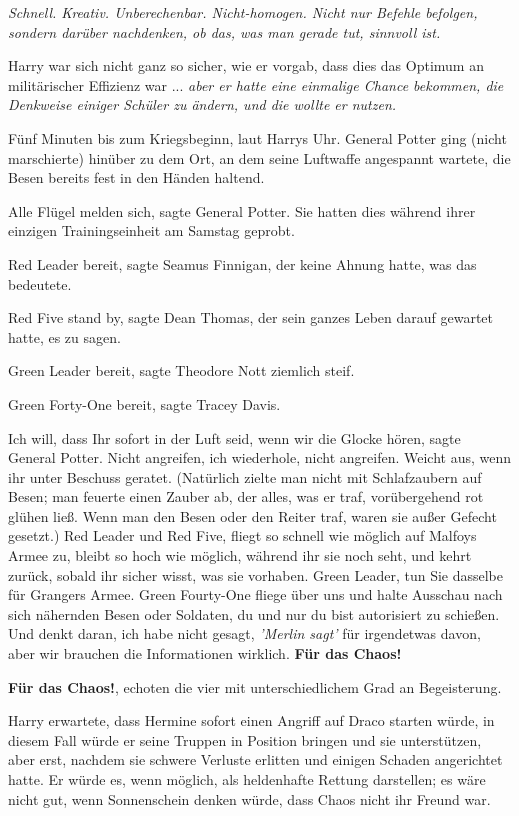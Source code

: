 \emph{Schnell. Kreativ. Unberechenbar. Nicht-homogen. Nicht nur Befehle
befolgen, sondern darüber nachdenken, ob das, was man gerade tut, sinnvoll ist.}

Harry war sich nicht ganz so sicher, wie er vorgab, dass dies das Optimum an
militärischer Effizienz war ... \emph{aber er hatte eine einmalige Chance
bekommen, die Denkweise einiger Schüler zu ändern, und die wollte er nutzen.}

Fünf Minuten bis zum Kriegsbeginn, laut Harrys Uhr. General Potter ging (nicht
marschierte) hinüber zu dem Ort, an dem seine Luftwaffe angespannt wartete, die
Besen bereits fest in den Händen haltend.

\glqq{}Alle Flügel melden sich\grqq{}, sagte General Potter. Sie hatten dies
während ihrer einzigen Trainingseinheit am Samstag geprobt.

\glqq{}Red Leader bereit\grqq{}, sagte Seamus Finnigan, der keine Ahnung hatte,
was das bedeutete.

\glqq{}Red Five stand by\grqq{}, sagte Dean Thomas, der sein ganzes Leben darauf
gewartet hatte, es zu sagen.

\glqq{}Green Leader bereit\grqq{}, sagte Theodore Nott ziemlich steif.

\glqq{}
Green Forty-One bereit\grqq{}, sagte Tracey Davis.

\glqq{}Ich will, dass Ihr sofort in der Luft seid, wenn wir die Glocke
hören\grqq{}, sagte General Potter. \glqq{}Nicht angreifen, ich wiederhole,
nicht angreifen. Weicht aus, wenn ihr unter Beschuss geratet.\grqq{} (Natürlich
zielte man nicht mit Schlafzaubern auf Besen; man feuerte einen Zauber ab, der
alles, was er traf, vorübergehend rot glühen ließ. Wenn man den Besen oder den
Reiter traf, waren sie außer Gefecht gesetzt.) \glqq{}Red Leader und Red Five,
fliegt so schnell wie möglich auf Malfoys Armee zu, bleibt so hoch wie möglich,
während ihr sie noch seht, und kehrt zurück, sobald ihr sicher wisst, was sie
vorhaben. Green Leader, tun Sie dasselbe für Grangers Armee. Green Fourty-One
fliege über uns und halte Ausschau nach sich nähernden Besen oder Soldaten, du
und nur du bist autorisiert zu schießen. Und denkt daran, ich habe nicht gesagt,
\emph{'Merlin sagt'} für irgendetwas davon, aber wir brauchen die Informationen
wirklich. \textbf{Für das Chaos!}\grqq{}

\glqq{}\textbf{Für das Chaos!}\grqq{}, echoten die vier mit unterschiedlichem
Grad an Begeisterung.

Harry erwartete, dass Hermine sofort einen Angriff auf Draco starten würde, in
diesem Fall würde er seine Truppen in Position bringen und sie unterstützen,
aber erst, nachdem sie schwere Verluste erlitten und einigen Schaden angerichtet
hatte. Er würde es, wenn möglich, als heldenhafte Rettung darstellen; es wäre
nicht gut, wenn Sonnenschein denken würde, dass Chaos nicht ihr Freund war.

